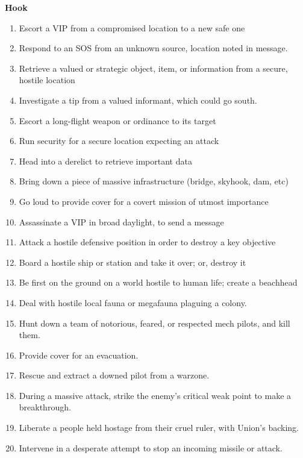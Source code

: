 \textbf{Hook}
\begin{enumerate}
    \item Escort a VIP from a compromised location to a new safe one
    \item Respond to an SOS from an unknown source, location noted in message.
    \item Retrieve a valued or strategic object, item, or information from a secure, hostile location
    \item Investigate a tip from a valued informant, which could go south.
    \item Escort a long-flight weapon or ordinance to its target
    \item Run security for a secure location expecting an attack
    \item Head into a derelict to retrieve important data
    \item Bring down a piece of massive infrastructure (bridge, skyhook, dam, etc)
    \item Go loud to provide cover for a covert mission of utmost importance
    \item Assassinate a VIP in broad daylight, to send a message
    \item Attack a hostile defensive position in order to destroy a key objective
    \item Board a hostile ship or station and take it over; or, destroy it
    \item Be first on the ground on a world hostile to human life; create a beachhead
    \item Deal with hostile local fauna or megafauna plaguing a colony.
    \item Hunt down a team of notorious, feared, or respected mech pilots, and kill them.
    \item Provide cover for an evacuation.
    \item Rescue and extract a downed pilot from a warzone.
    \item During a massive attack, strike the enemy’s critical weak point to make a breakthrough.
    \item Liberate a people held hostage from their cruel ruler, with Union’s backing.
    \item Intervene in a desperate attempt to stop an incoming missile or attack.
\end{enumerate}

